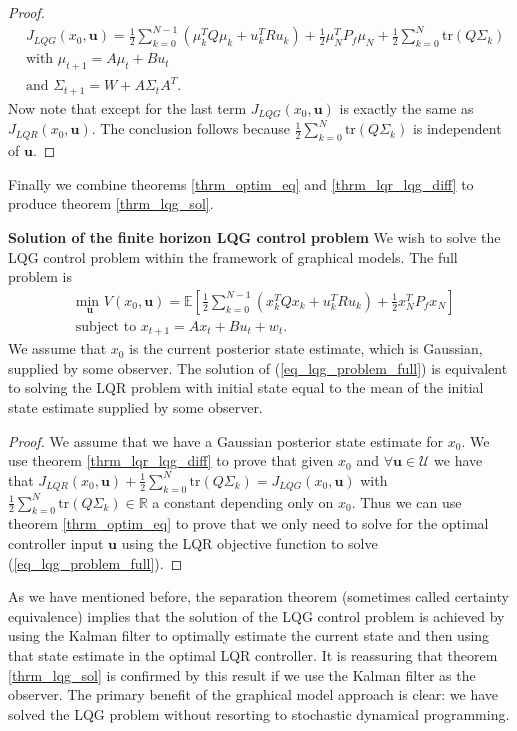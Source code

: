\begin{proof}
\begin{equation}
\begin{aligned}
&J_{LQG}(x_0, \mathbf{u}) = \frac{1}{2}\sum_{k=0}^{N-1} \left( \mu_k^TQ\mu_k + u_k^TRu_k \right) + \frac{1}{2}\mu_N^TP_f\mu_N + \frac{1}{2}\sum_{k=0}^N \text{tr}(Q\Sigma_k) \\
&\text{with } \mu_{t+1} = A\mu_t +Bu_t \\
&\text{and } \Sigma_{t+1} = W+A\Sigma_t A^T.
\end{aligned}
\label{eq_simpl_obj_func}
\end{equation}
Now note that except for the last term $J_{LQG}(x_0, \mathbf{u})$ is exactly the same as $J_{LQR}(x_0, \mathbf{u})$. The conclusion follows because $\frac{1}{2}\sum_{k=0}^N \text{tr}(Q\Sigma_k)$ is independent of $\mathbf{u}$. 
\end{proof}
Finally we combine theorems \ref{thrm_optim_eq} and \ref{thrm_lqr_lqg_diff} to produce theorem \ref{thrm_lqg_sol}.
\begin{thrm}
\textbf{Solution of the finite horizon LQG control problem} We wish to solve the LQG control problem within the framework of graphical models. The full problem is 
\begin{equation}
\begin{aligned}
&\underset{\mathbf{u}}{\text{min }} V(x_0, \mathbf{u}) = \mathbb{E}\left[ \frac{1}{2}\sum_{k=0}^{N-1} \left( x_k^TQx_k + u_k^TRu_k \right) + \frac{1}{2}x_N^TP_fx_N \right] \\
& \text{subject to } x_{t+1}=Ax_t+Bu_t + w_t.
\end{aligned}
\label{eq_lqg_problem_full}
\end{equation}
We assume that $x_0$ is the current posterior state estimate, which is Gaussian, supplied by some observer. The solution of (\ref{eq_lqg_problem_full}) is equivalent to solving the LQR problem with initial state equal to the mean of the initial state estimate supplied by some observer.
\label{thrm_lqg_sol}
\end{thrm}
\begin{proof}
We assume that we have a Gaussian posterior state estimate for $x_0$. We use theorem \ref{thrm_lqr_lqg_diff} to prove that given $x_0$ and $\forall \mathbf{u} \in \mathcal{U}$ we have that $J_{LQR}(x_0, \mathbf{u}) + \frac{1}{2}\sum_{k=0}^N \text{tr}(Q\Sigma_k) = J_{LQG}(x_0, \mathbf{u})$ with $\frac{1}{2}\sum_{k=0}^N \text{tr}(Q\Sigma_k) \in \mathbb{R}$ a constant depending only on $x_0$. Thus we can use theorem \ref{thrm_optim_eq} to prove that we only need to solve for the optimal controller input $\mathbf{u}$ using the LQR objective function to solve (\ref{eq_lqg_problem_full}). 
\end{proof}
As we have mentioned before, the separation theorem (sometimes called certainty equivalence) implies that the solution of the LQG control problem is achieved by using the Kalman filter to optimally estimate the current state and then using that state estimate in the optimal LQR controller. It is reassuring that theorem \ref{thrm_lqg_sol} is confirmed by this result if we use the Kalman filter as the observer. The primary benefit of the graphical model approach is clear: we have solved the LQG problem without resorting to stochastic dynamical programming.

